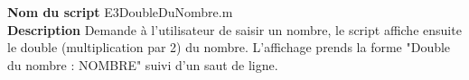 \textbf{Nom du script}
E3DoubleDuNombre.m\\
\textbf{Description}
Demande à l’utilisateur de saisir un nombre, le script affiche ensuite le double (multiplication par 2) du nombre. L'affichage prends la forme "Double du nombre : NOMBRE" suivi d'un saut de ligne.